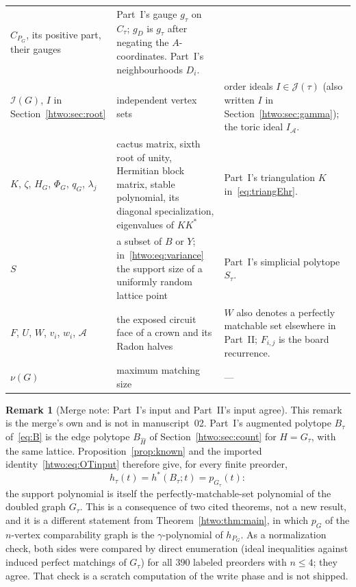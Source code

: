 \documentclass[11pt]{article}
\numberwithin{equation}{section}
\theoremstyle{definition}
\newtheorem{remark}[theorem]{Remark}
\newcommand{\J}{\mathcal J(\tau)}
\begin{document}
\begin{table}[htbp]
\begin{tabularx}{\textwidth}{@{}>{\raggedright}p{}>{\raggedright}p{}Y@{}}
 $C_{P_G}$, its positive part, their gauges & Part~I's gauge $g_\tau$ on
 $C_\tau$; $g_D$ is $g_\tau$ after negating the $A$-coordinates. Part~I's
 neighbourhoods $D_i$.\\
$\mathcal I(G)$, $I$ in Section~\ref{htwo:sec:root} & independent vertex sets &
 order ideals $I\in\J$ (also written $I$ in Section~\ref{htwo:sec:gamma});
 the toric ideal $I_{\mathcal A}$.\\
$K$, $\zeta$, $H_G$, $\Phi_G$, $q_G$, $\lambda_j$ & cactus matrix, sixth root of
 unity, Hermitian block matrix, stable polynomial, its diagonal specialization,
 eigenvalues of $KK^*$ & Part~I's triangulation $K$ in~\eqref{eq:triangEhr}.\\
$S$ & a subset of $B$ or $Y$; in~\eqref{htwo:eq:variance} the support size of
 a uniformly random lattice point & Part~I's simplicial polytope $S_\tau$.\\
$F$, $U$, $W$, $v_i$, $w_i$, $\mathcal A$ & the exposed circuit face of a
 crown and its Radon halves & $W$ also denotes a perfectly matchable set
 elsewhere in Part~II; $F_{i,j}$ is the board recurrence.\\
$\nu(G)$ & maximum matching size & ---\\
\bottomrule
\end{tabularx}
\end{table}

\begin{remark}[Merge note: Part~I's input and Part~II's input agree]
\label{htwo:rem:doubled}
This remark is the merge's own and is not in manuscript~02. Part~I's
augmented polytope $B_\tau$ of~\eqref{eq:B} is the edge polytope
$B_{\widehat H}$ of Section~\ref{htwo:sec:count} for $H=G_\tau$, with the same
lattice. Proposition~\ref{prop:known} and the imported
identity~\eqref{htwo:eq:OTinput} therefore give, for every finite preorder,
\[
 h_\tau(t)=h^*(B_\tau;t)=p_{G_\tau}(t):
\]
the support polynomial is itself the perfectly-matchable-set polynomial of
the doubled graph $G_\tau$. This is a consequence of two cited theorems, not a
new result, and it is a different statement from
Theorem~\ref{htwo:thm:main}, in which $p_G$ of the $n$-vertex comparability
graph is the $\gamma$-polynomial of $h_{P_G}$. As a normalization check, both
sides were compared by direct enumeration (ideal inequalities against
induced perfect matchings of $G_\tau$) for all $390$ labeled preorders with
$n\le4$; they agree. That check is a scratch computation of the write phase
and is not shipped.
\end{remark}
\end{document}
